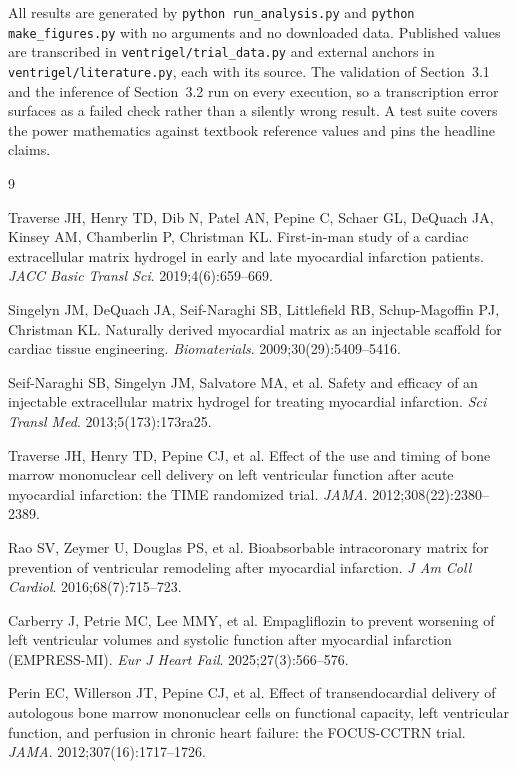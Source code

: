 \documentclass[10pt,twocolumn,letterpaper]{article}
\begin{document}
All results are generated by \texttt{python run\_analysis.py} and \texttt{python make\_figures.py}
with no arguments and no downloaded data. Published values are transcribed in
\texttt{ventrigel/trial\_data.py} and external anchors in \texttt{ventrigel/literature.py}, each with
its source. The validation of Section~3.1 and the inference of Section~3.2 run on every execution, so
a transcription error surfaces as a failed check rather than a silently wrong result. A test suite
covers the power mathematics against textbook reference values and pins the headline claims.

\begin{thebibliography}{9}
\footnotesize

Traverse JH, Henry TD, Dib N, Patel AN, Pepine C, Schaer GL, DeQuach JA, Kinsey AM, Chamberlin P,
Christman KL. First-in-man study of a cardiac extracellular matrix hydrogel in early and late
myocardial infarction patients. \textit{JACC Basic Transl Sci}. 2019;4(6):659--669.

Singelyn JM, DeQuach JA, Seif-Naraghi SB, Littlefield RB, Schup-Magoffin PJ, Christman KL. Naturally
derived myocardial matrix as an injectable scaffold for cardiac tissue engineering.
\textit{Biomaterials}. 2009;30(29):5409--5416.

Seif-Naraghi SB, Singelyn JM, Salvatore MA, et al. Safety and efficacy of an injectable extracellular
matrix hydrogel for treating myocardial infarction. \textit{Sci Transl Med}. 2013;5(173):173ra25.

Traverse JH, Henry TD, Pepine CJ, et al. Effect of the use and timing of bone marrow mononuclear cell
delivery on left ventricular function after acute myocardial infarction: the TIME randomized trial.
\textit{JAMA}. 2012;308(22):2380--2389.

Rao SV, Zeymer U, Douglas PS, et al. Bioabsorbable intracoronary matrix for prevention of ventricular
remodeling after myocardial infarction. \textit{J Am Coll Cardiol}. 2016;68(7):715--723.

Carberry J, Petrie MC, Lee MMY, et al. Empagliflozin to prevent worsening of left ventricular volumes
and systolic function after myocardial infarction (EMPRESS-MI). \textit{Eur J Heart Fail}.
2025;27(3):566--576.

Perin EC, Willerson JT, Pepine CJ, et al. Effect of transendocardial delivery of autologous bone
marrow mononuclear cells on functional capacity, left ventricular function, and perfusion in chronic
heart failure: the FOCUS-CCTRN trial. \textit{JAMA}. 2012;307(16):1717--1726.


\end{thebibliography}
\end{document}
